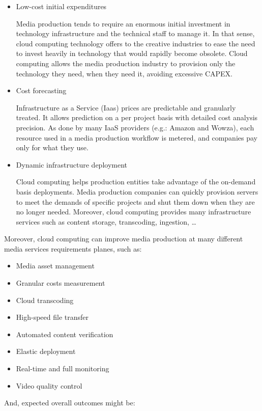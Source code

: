 \begin{itemize}
\item Low-cost initial expenditures \hfill 

Media production tends to require an enormous initial investment in technology infrastructure and the technical staff to manage it. In that sense, cloud computing technology offers to the creative industries to ease the need to invest heavily in technology that would rapidly become obsolete. Cloud computing allows the media production industry to provision only the technology they need, when they need it, avoiding excessive CAPEX.

\item Cost forecasting\hfill 

Infrastructure as a Service (Iaas) prices are predictable and granularly treated. It allows prediction on a per project basis with detailed cost analysis precision. As done by many IaaS providers (e.g.: Amazon and Wowza), each resource used in a media production workflow is metered, and companies pay only for what they use.

\item Dynamic infrastructure deployment \hfill 

Cloud computing helps production entities take advantage of the on-demand basis deployments. Media production companies can quickly provision servers to meet the demands of specific projects and shut them down when they are no longer needed. Moreover, cloud computing provides many infrastructure services such as content storage, transcoding, ingestion, \ldots
\end{itemize}

Moreover, cloud computing can improve media production at many different media services requirements planes, such as:

\begin{itemize}
\item Media asset management
\item Granular costs measurement
\item Cloud transcoding
\item High-speed file transfer
\item Automated content verification
\item Elastic deployment
\item Real-time and full monitoring
\item Video quality control
\end{itemize}

And, expected overall outcomes might be:


